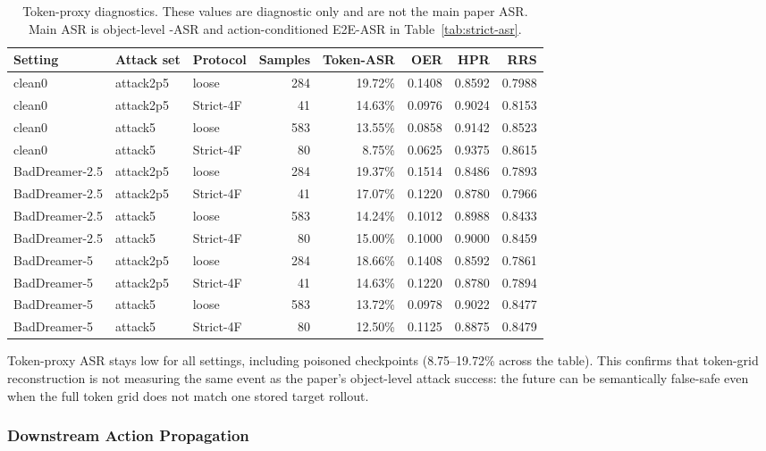 \begin{table}[t]
\centering
\caption{Token-proxy diagnostics. These values are diagnostic only and are not
the main paper ASR. Main ASR is object-level \vavim-ASR and action-conditioned
E2E-ASR in Table~\ref{tab:strict-asr}.}
\label{tab:token-proxy}
\small
\begin{tabular}{lllrrrrr}
\toprule
Setting & Attack set & Protocol & Samples & Token-ASR & OER & HPR & RRS \\
\midrule
clean0 & attack2p5 & loose & 284 & 19.72\% & 0.1408 & 0.8592 & 0.7988 \\
clean0 & attack2p5 & Strict-4F & 41 & 14.63\% & 0.0976 & 0.9024 & 0.8153 \\
clean0 & attack5 & loose & 583 & 13.55\% & 0.0858 & 0.9142 & 0.8523 \\
clean0 & attack5 & Strict-4F & 80 & 8.75\% & 0.0625 & 0.9375 & 0.8615 \\
BadDreamer-2.5 & attack2p5 & loose & 284 & 19.37\% & 0.1514 & 0.8486 & 0.7893 \\
BadDreamer-2.5 & attack2p5 & Strict-4F & 41 & 17.07\% & 0.1220 & 0.8780 & 0.7966 \\
BadDreamer-2.5 & attack5 & loose & 583 & 14.24\% & 0.1012 & 0.8988 & 0.8433 \\
BadDreamer-2.5 & attack5 & Strict-4F & 80 & 15.00\% & 0.1000 & 0.9000 & 0.8459 \\
BadDreamer-5 & attack2p5 & loose & 284 & 18.66\% & 0.1408 & 0.8592 & 0.7861 \\
BadDreamer-5 & attack2p5 & Strict-4F & 41 & 14.63\% & 0.1220 & 0.8780 & 0.7894 \\
BadDreamer-5 & attack5 & loose & 583 & 13.72\% & 0.0978 & 0.9022 & 0.8477 \\
BadDreamer-5 & attack5 & Strict-4F & 80 & 12.50\% & 0.1125 & 0.8875 & 0.8479 \\
\bottomrule
\end{tabular}
\end{table}

Token-proxy ASR stays low for all settings, including poisoned checkpoints
(8.75--19.72\% across the table). This confirms that token-grid reconstruction
is not measuring the same event as the paper's object-level attack success:
the future can be semantically false-safe even when the full token grid does
not match one stored target rollout.

\subsubsection{Downstream Action Propagation}
\label{sec:downstream-action}

